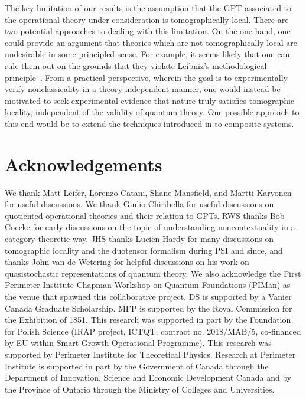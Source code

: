 \documentclass[10pt,twocolumn,aps,groupedaddress,nofootinbib]{revtex4}
\begin{document}
The key limitation of our results is the assumption that the  GPT associated to the operational theory under consideration is tomographically local.
There are two potential approaches to dealing with this limitation. On the one hand, one could provide an argument that theories which are not tomographically local are undesirable in some principled sense. For example, it seems likely that one can rule them out on the grounds that they violate Leibniz's methodological principle~\cite{Leibniz}. From a practical perspective, wherein the goal is to experimentally verify nonclassicality in a theory-independent manner, one would instead be motivated to seek experimental evidence that nature truly satisfies tomographic locality, independent of the validity of quantum theory. One possible approach to this end would be to extend
 the techniques introduced in \cite{bootstraptomography} to composite systems.



\section*{Acknowledgements}
We thank Matt Leifer, Lorenzo Catani, Shane Mansfield, and Martti Karvonen for useful discussions.
We thank Giulio Chiribella for useful discussions on quotiented operational theories and their relation to GPTs.
RWS thanks Bob Coecke for early discussions on the topic of understanding noncontextuality in a category-theoretic way. JHS thanks Lucien Hardy for many discussions on tomographic locality and the duotensor formalism during PSI and since, and thanks John van de Wetering for helpful discussions on his work on quasistochastic representations of quantum theory. We also acknowledge the First Perimeter Institute-Chapman Workshop on Quantum Foundations (PIMan) as the venue that spawned this collaborative project.
DS is supported by a Vanier Canada Graduate Scholarship. MFP is supported by the Royal Commission for the Exhibition of 1851. This research was supported in part by the Foundation for Polish Science (IRAP project,
ICTQT, contract no. 2018/MAB/5, co-financed by EU
within Smart Growth Operational Programme). This research was supported by Perimeter Institute for Theoretical Physics. Research at Perimeter Institute is supported in part by the Government of Canada through the Department of Innovation, Science and Economic Development Canada and by the Province of Ontario through the Ministry of Colleges and Universities.



\end{document}
